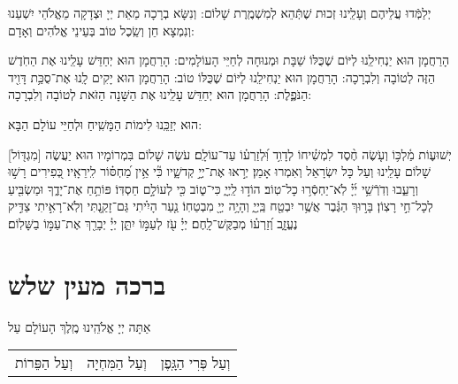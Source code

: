 \documentclass[a4paper, twoside, openany, parskip=half, 10pt]{article}
\begin{document}
\begin{multicols}{3}
\begin{sometimes}
\end{sometimes} 

 יְלַמְּֿדוּ עֲלֵיהֶם וְעָלֵֽינוּ זְכוּת שֶׁתְּֿהֵא לְמִשְׁמֶֽרֶת שָׁלוֹם: וְנִשָּׂא בְרָכָה מֵאֵת יְיָ וּצְדָקָה מֵאֱלֹהֵי יִשְׁעֵנוּ וְנִמְצָא חֵן וְשֵֽׂכֶל טוֹב בְּעֵינֵי אֱלֹהִים וְאָדָם:

\begin{sometimes}

\shabbos
 הָרַחֲמָן הוּא יַנְחִילֵֽנוּ לְיּוֹם שֶׁכֻּלּוֹ שַׁבָּת וּמְנוּחָה לְחַיֵּי הָעוֹלָמִים: 
 הָרַחֲמָן הוּא יְחַדֵּשׁ עָלֵֽינוּ אֶת הַחֹֽדֶשׁ הַזֶּה לְטוֹבָה וְלִבְרָכָה:
	 הָרַחֲמָן הוּא יַנְחִילֵֽנוּ לְיּוֹם שֶׁכֻּלּוֹ טוֹב:\hfill \break
{}
 הָרַחֲמָן הוּא יָקִים לָֽנוּ אֶת־סֻכַּ֥ת דָּוִ֖יד הַנֹּפֶ֑לֶת:\hfill \break
{}
	 הָרַחֲמָן הוּא יְחַדֵּשׁ עָלֵֽינוּ אֶת הַשָּׁנָה הַזֹּאת לְטוֹבָה וְלִבְרָכָה:
	 
\end{sometimes}

 הוּא יְזַכֵּֽנוּ לִימוֹת הַמָּשִֽׁיחַ וּלְחַיֵּי עוֹלָם הַבָּא: 
 
 

 
 [מִגְדּ֖וֹל] יְשׁוּע֢וֹת מַ֫לְכּ֥וֹ וְעֹ֤שֶׂה חֶ֨סֶד לִמְשִׁ֗יחוֹ לְדָוִ֥ד וּֽ֝לְזַרְע֗וֹ עַד־עוֹלָֽם׃ עֹשֶׂה שָׁלוֹם בִּמְרוֹמָיו הוּא יַעֲשֶׂה שָׁלוֹם עָלֵֽינוּ וְעַל כָּל יִשְׂרָאֵל וְאִמְרוּ אָמֵן׃
יְר֣אוּ אֶת־יְיָ֣ קְדשָׁ֑יו כִּ֘י אֵ֥ין מַ֝חְסּ֗וֹר לִֽירֵאָֽיו׃ 
כְּ֭פִירִים רָשׁ֣וּ וְרָעֵ֑בוּ וְדֹֽרְֿשֵׁ֥י יְ֜יָ֗ לֹֽא־יַחְסְֿר֥וּ כָל־טֽוֹב׃ 
הוֹד֣וּ לַֽיְיָ֑ כִּי־ט֑וֹב כִּ֖י לְעוֹלָ֣ם חַסְדּֽוֹ׃ פּוֹתֵ֥חַ אֶת־יָדֶ֑ךָ וּמַשְׂבִּ֖יעַ לְכָל־חַ֣י רָצֽוֹן׃ בָּר֣וּךְ הַגֶּ֔בֶר אֲשֶׁ֥ר יִבְטַ֖ח בַּֽיְיָ֑ וְהָיָ֥ה יְיָ֖ מִבְטַחֽוֹ׃ נַ֤עַר הָיִ֗יתִי גַּם־זָקַ֥נְתִּי וְלֹֽא־רָאִ֣יתִי צַדִּ֣יק נֶעֱזָ֑ב וְ֝זַרְע֗וֹ מְבַקֶּשׁ־לָֽחֶם׃ יְיָ֗ עֹ֖ז לְעַמּ֣וֹ יִתֵּ֑ן יְיָ֓ יְבָרֵ֖ךְ אֶת־עַמּ֣וֹ בַשָּׁלֽוֹם׃\\

\section[ברכה מעין שלש]{ ברכה מעין שלש }


 אַתָּה יְיָ אֱלֹהֵֽינוּ מֶֽלֶךְ הָעוֹלָם עַל\\ 
 \begin{tabular}{c|c|c}
וְעַל הַפֵּרוֹת & וְעַל הַמִּחְיָה & וְעַל פְּרִי הַגָּֽפֶן\\
\end{tabular}


\end{multicols}
\end{document}

